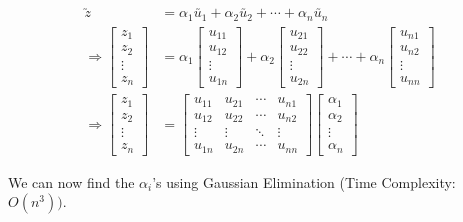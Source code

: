 \documentclass[10pt, aspectratio=169]{beamer}
\begin{document}
\begin{frame}
\begin{align*}
\utilde{z} &= \alpha_1 \utilde{u_1} + \alpha_2 \utilde{u_2} + \cdots + \alpha_n \utilde{u_n} \\[1.5em]
\Rightarrow \begin{bmatrix}
z_1 \\
z_2 \\
\vdots \\
z_n
\end{bmatrix}
&=
\alpha_1
\begin{bmatrix}
u_{11} \\
u_{12} \\
\vdots \\
u_{1n}
\end{bmatrix}
+
\alpha_2
\begin{bmatrix}
u_{21} \\
u_{22} \\
\vdots \\
u_{2n}
\end{bmatrix}
+ \cdots +
\alpha_n
\begin{bmatrix}
u_{n1} \\
u_{n2} \\
\vdots \\
u_{nn}
\end{bmatrix}
\\[1.5em]
\Rightarrow \begin{bmatrix}
z_1 \\
z_2 \\
\vdots \\
z_n
\end{bmatrix}
&=
\begin{bmatrix}
u_{11} & u_{21} & \cdots & u_{n1} \\
u_{12} & u_{22} & \cdots & u_{n2} \\
\vdots & \vdots & \ddots & \vdots \\
u_{1n} & u_{2n} & \cdots & u_{nn}
\end{bmatrix}
\begin{bmatrix}
\alpha_1 \\
\alpha_2 \\
\vdots \\
\alpha_n
\end{bmatrix}
\end{align*}

We can now find the $\alpha_i$'s using Gaussian Elimination (Time Complexity: $O(n^3))$.
\end{frame}
\end{document}
